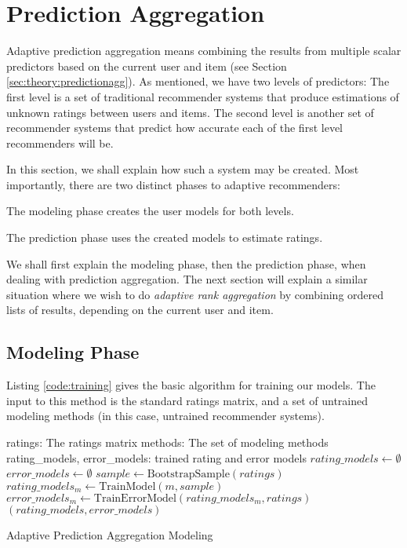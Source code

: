 \section{Prediction Aggregation}

Adaptive prediction aggregation means combining the results
from multiple scalar predictors based on the current user and item
(see Section \ref{sec:theory:predictionagg}).
As mentioned, we have two levels of predictors:
The first level is a set of traditional recommender systems
that produce estimations of unknown ratings between users and items.
The second level is another set of recommender systems 
that predict how accurate each of the first level recommenders will be.

In this section, we shall explain how such a system may be created.
Most importantly, there are two distinct phases to adaptive recommenders:

\begin{enumerate*}
  \item The modeling phase creates the user models for both levels.
  \item The prediction phase uses the created models to estimate ratings.
\end{enumerate*}

We shall first explain the modeling phase, then the prediction phase,
when dealing with prediction aggregation.
The next section will explain a similar situation where
we wish to do \emph{adaptive rank aggregation} by 
combining ordered lists of results, depending on the current user and item.


\subsection{Modeling Phase}

Listing \ref{code:training} gives the basic algorithm for training
our models. The input to this method is the standard ratings matrix,
and a set of untrained modeling methods (in this case,
untrained recommender systems).

\begin{algorithm}
  \begin{algorithmic}[1]
  \REQUIRE ratings: The ratings matrix
  \REQUIRE methods: The set of modeling methods
  \ENSURE  rating\_models, error\_models: trained rating and error models 
    \STATE $rating\_models \gets \emptyset$
    \STATE $error\_models \gets \emptyset$
      \STATE $sample \gets \mathrm{BootstrapSample}(ratings)$
      \STATE $rating\_models_m \gets \mathrm{TrainModel}(m, sample)$
      \STATE $error\_models_m  \gets \mathrm{TrainErrorModel}(rating\_models_m, ratings)$
    \ENDFOR 
  \RETURN $(rating\_models, error\_models)$
  \end{algorithmic}
  \caption[Adaptive Prediction Aggregation Modeling]{Adaptive Prediction Aggregation Modeling
  }
  \label{code:training}
\end{algorithm}

